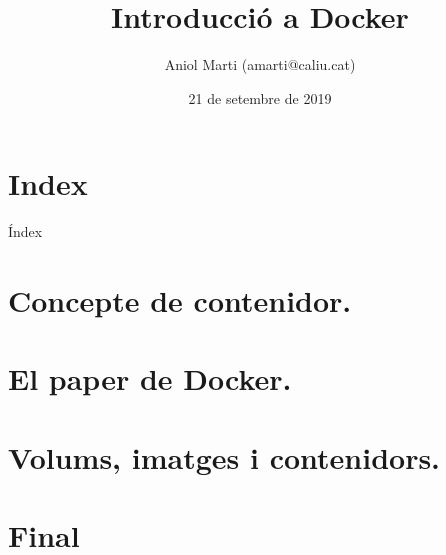 \documentclass[aspectratio=149,dvipsnames,svgnames,unicode]{beamer}
\title{Introducció a Docker}
\author{Aniol Marti (amarti@caliu.cat)}
\institute[Caliu]{Caliu - Catalan Linux Users}
\date{21 de setembre de 2019}
\begin{document}
\begin{frame}[plain]
   \titlepage
\end{frame}  

\section*{Index}
\begin{frame}{Índex}
	\tableofcontents
\end{frame}

\section{Concepte de contenidor.}

\section{El paper de Docker.}

\section{Volums, imatges i contenidors.}


\section*{Final}

\end{document}
